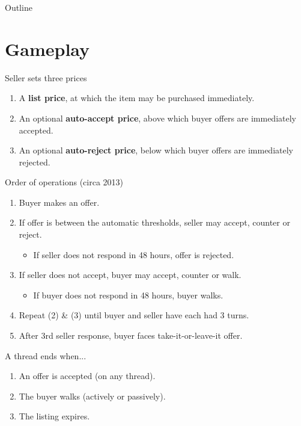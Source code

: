 \documentclass[aspectratio=169]{beamer}
\begin{document}
\begin{frame}{Outline}\tableofcontents\end{frame}

\section{Gameplay}

\begin{frame}{Seller sets three prices}
	\begin{enumerate}
		\item A \textbf{list price}, at which the item may be purchased immediately.
		\item An optional \textbf{auto-accept price}, above which buyer offers are immediately accepted.
		\item An optional \textbf{auto-reject price}, below which buyer offers are immediately rejected.
	\end{enumerate}
\end{frame}

\begin{frame}{Order of operations (circa 2013)}
	\begin{enumerate}
		\item Buyer makes an offer.\pause
		\item If offer is between the automatic thresholds, seller may accept, counter or reject.
		\begin{itemize}
			\item If seller does not respond in 48 hours, offer is rejected.
		\end{itemize}\pause
		\item If seller does not accept, buyer may accept, counter or walk.
		\begin{itemize}
			\item If buyer does not respond in 48 hours, buyer walks.
		\end{itemize}\pause
		\item Repeat (2) \& (3) until buyer and seller have each had 3 turns.\pause
		\item After 3rd seller response, buyer faces take-it-or-leave-it offer.
	\end{enumerate}
\end{frame}

\begin{frame}{A thread ends when...}
	\begin{enumerate}
		\item An offer is accepted (on any thread).
		\item The buyer walks (actively or passively).
		\item The listing expires.
	\end{enumerate}		
\end{frame}
\end{document}
